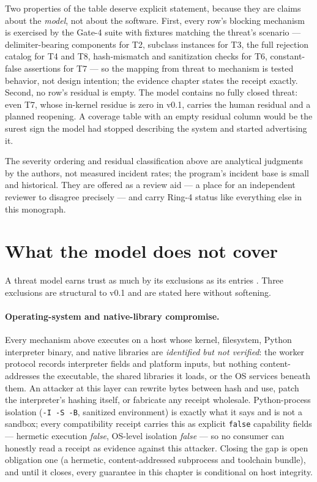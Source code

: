 Two properties of the table deserve explicit statement, because they are claims about the \emph{model}, not about the software. First, every row's blocking mechanism is exercised by the Gate-4 suite with fixtures matching the threat's scenario --- delimiter-bearing components for T2, subclass instances for T3, the full rejection catalog for T4 and T8, hash-mismatch and sanitization checks for T6, constant-false assertions for T7 --- so the mapping from threat to mechanism is tested behavior, not design intention; the evidence chapter states the receipt exactly. Second, no row's residual is empty. The model contains no fully closed threat: even T7, whose in-kernel residue is zero in v0.1, carries the human residual and a planned reopening. A coverage table with an empty residual column would be the surest sign the model had stopped describing the system and started advertising it.

\begin{boundary}\label{threat:bd:coverage}
The severity ordering and residual classification above are analytical judgments by the authors, not measured incident rates; the program's incident base is small and historical. They are offered as a review aid --- a place for an independent reviewer to disagree precisely --- and carry Ring-4 status like everything else in this monograph.
\end{boundary}

\section{What the model does not cover}\label{threat:scope}

A threat model earns trust as much by its exclusions as its entries \cite{shostack}. Three exclusions are structural to v0.1 and are stated here without softening.

\paragraph{Operating-system and native-library compromise.} Every mechanism above executes on a host whose kernel, filesystem, Python interpreter binary, and native libraries are \emph{identified but not verified}: the worker protocol records interpreter fields and platform inputs, but nothing content-addresses the executable, the shared libraries it loads, or the OS services beneath them. An attacker at this layer can rewrite bytes between hash and use, patch the interpreter's hashing itself, or fabricate any receipt wholesale. Python-process isolation (\texttt{-I -S -B}, sanitized environment) is exactly what it says and is not a sandbox; every compatibility receipt carries this as explicit \texttt{false} capability fields --- hermetic execution \emph{false}, OS-level isolation \emph{false} --- so no consumer can honestly read a receipt as evidence against this attacker. Closing the gap is open obligation one (a hermetic, content-addressed subprocess and toolchain bundle), and until it closes, every guarantee in this chapter is conditional on host integrity.

